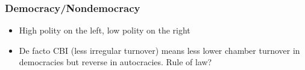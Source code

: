 \documentclass[]{beamer}
\begin{document}
    \begin{frame}
        \frametitle{Democracy/Nondemocracy}
        \begin{itemize}
            \item High polity on the left, low polity on the right
            \item De facto CBI (less irregular turnover) means less lower chamber turnover in democracies but reverse in autocracies. Rule of law?
        \end{itemize}
    \end{frame}
\end{document}
